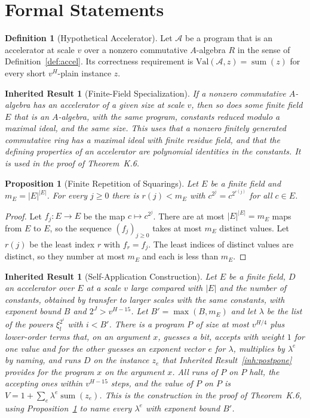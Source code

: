 \documentclass[11pt,letterpaper]{report}
\theoremstyle{plain}
\newtheorem{proposition}[theorem]{Proposition}
\newtheorem{inherited}[theorem]{Inherited Result}
\theoremstyle{definition}
\newtheorem{definition}[theorem]{Definition}
\theoremstyle{remark}
\begin{document}
\section{Formal Statements}

\begin{definition}[Hypothetical Accelerator]
Let $\mathcal A$ be a program that is an accelerator at scale $v$ over a nonzero commutative $A$-algebra $R$ in the sense of Definition~\ref{def:accel}. Its correctness requirement is $\mathrm{Val}(\mathcal A,z)=\operatorname{sum}(z)$ for every short $v^H$-plain instance $z$.
\end{definition}

\begin{inherited}[Finite-Field Specialization]
If a nonzero commutative $A$-algebra has an accelerator of a given size at scale $v$, then so does some finite field $E$ that is an $A$-algebra, with the same program, constants reduced modulo a maximal ideal, and the same size. This uses that a nonzero finitely generated commutative ring has a maximal ideal with finite residue field, and that the defining properties of an accelerator are polynomial identities in the constants. It is used in the proof of Theorem~K.6.
\end{inherited}

\begin{proposition}[Finite Repetition of Squarings]\label{pr:finsq}
Let $E$ be a finite field and $m_E=|E|^{|E|}$. For every $j\ge0$ there is $r(j)<m_E$ with $c^{2^j}=c^{2^{r(j)}}$ for all $c\in E$.
\end{proposition}
\begin{proof}
Let $f_j:E\to E$ be the map $c\mapsto c^{2^j}$. There are at most $|E|^{|E|}=m_E$ maps from $E$ to $E$, so the sequence $(f_j)_{j\ge0}$ takes at most $m_E$ distinct values. Let $r(j)$ be the least index $r$ with $f_r=f_j$. The least indices of distinct values are distinct, so they number at most $m_E$ and each is less than $m_E$.
\end{proof}

\begin{inherited}[Self-Application Construction]\label{inh:selfapp}
Let $E$ be a finite field, $D$ an accelerator over $E$ at a scale $v$ large compared with $|E|$ and the number of constants, obtained by transfer to larger scales with the same constants, with exponent bound $B$ and $2^J>v^{H-15}$. Let $B'=\max(B,m_E)$ and let $\lambda$ be the list of the powers $\xi_l^{2^i}$ with $i<B'$. There is a program $P$ of size at most $v^{H/4}$ plus lower-order terms that, on an argument $x$, guesses a bit, accepts with weight $1$ for one value and for the other guesses an exponent vector $e$ for $\lambda$, multiplies by $\lambda^e$ by naming, and runs $D$ on the instance $z_e$ that Inherited Result~\ref{inh:postpone} provides for the program $x$ on the argument $x$. All runs of $P$ on $P$ halt, the accepting ones within $v^{H-15}$ steps, and the value of $P$ on $P$ is $V=1+\sum_e\lambda^e\operatorname{sum}(z_e)$. This is the construction in the proof of Theorem~K.6, using Proposition~\ref{pr:finsq} to name every $\lambda^e$ with exponent bound $B'$.
\end{inherited}
\end{document}

